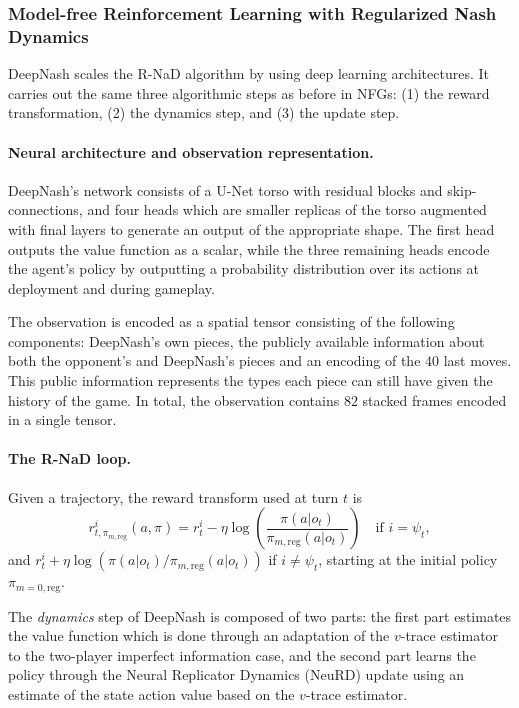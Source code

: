 \subsubsection{Model-free Reinforcement Learning with Regularized Nash Dynamics}
DeepNash scales the R-NaD algorithm by using deep learning architectures. It carries out the same three algorithmic steps as before in NFGs: (1) the reward transformation, (2) the dynamics step, and (3) the update step.

\paragraph{Neural architecture and observation representation.}
DeepNash's network consists of a U-Net torso with residual blocks and skip-connections, and four heads which are smaller replicas of the torso augmented with final layers to generate an output of the appropriate shape. The first head outputs the value function as a scalar, while the three remaining heads encode the agent's policy by outputting a probability distribution over its actions at deployment and during gameplay.

The observation is encoded as a spatial tensor consisting of the following components: DeepNash's own pieces, the publicly available information about both the opponent's and DeepNash's pieces and an encoding of the $40$ last moves. This public information represents the types each piece can still have given the history of the game. In total, the observation contains $82$ stacked frames encoded in a single tensor.

\paragraph{The R-NaD loop.}
Given a trajectory, the reward transform used at turn $t$ is
$$r^i_{t,\pi_{m,\textrm{reg}}}(a, \pi) = r^i_t - \eta \log\!\left(\frac{\pi(a|o_t)}{\pi_{m, \textrm{reg}}(a|o_t)}\right)\quad \text{if } i = \psi_t,$$
and $r^i_t + \eta \log(\pi(a|o_t)/\pi_{m, \textrm{reg}}(a|o_t))$ if $i \neq \psi_t$, starting at the initial policy $\pi_{m=0,\textrm{reg}}$.

The \emph{dynamics} step of DeepNash is composed of two parts: the first part estimates the value function which is done through an adaptation of the $v$-trace estimator to the two-player imperfect information case, and the second part learns the policy through the Neural Replicator Dynamics (NeuRD) update using an estimate of the state action value based on the $v$-trace estimator.

